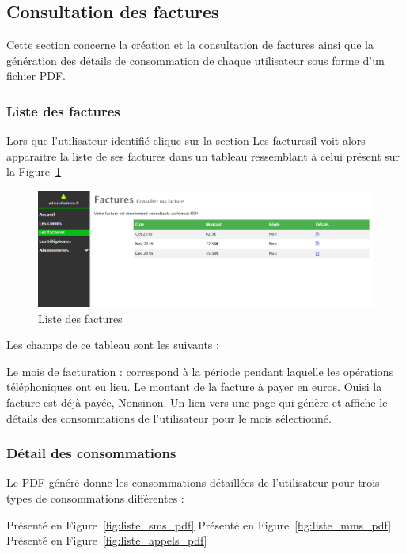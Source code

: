\subsection{Consultation des factures}
Cette section concerne la création et la consultation de factures ainsi que la génération des détails de consommation de chaque utilisateur sous forme d'un fichier PDF.
\subsubsection{Liste des factures}
Lors que l'utilisateur identifié clique sur la section \og Les factures\fg il voit alors apparaitre la liste de ses factures dans un tableau ressemblant à celui présent sur la Figure~\ref{fig:listfacture}

\begin{figure}[ht]
  \centering
    \includegraphics[width=.55\textwidth]{images/Plateforme/liste_factures}
    \caption{Liste des factures}
    \label{fig:listfacture}
\end{figure}

Les champs de ce tableau sont les suivants :
\begin{itemize}
  Le mois de facturation : correspond à la période pendant laquelle les opérations téléphoniques ont eu lieu.
  Le montant de la facture à payer en euros.
  \og Oui\fg si la facture est déjà payée, \og Non\fg sinon.
  Un lien vers une page qui génère et affiche le détails des consommations de l'utilisateur pour le mois sélectionné.
\end{itemize}

\subsubsection{Détail des consommations}

Le PDF généré donne les consommations détaillées de l'utilisateur pour trois types de consommations différentes :
\begin{itemize}
	Présenté en Figure~\ref{fig:liste_sms_pdf}
	Présenté en Figure~\ref{fig:liste_mms_pdf}
	Présenté en Figure~\ref{fig:liste_appels_pdf}
\end{itemize}

